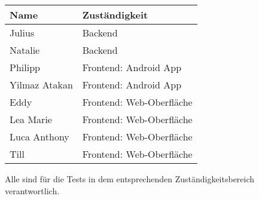 \begin{tabular}{ll}
 \rowcolor[HTML]{E7E7E7} 
 \textbf{Name} & \textbf{Zuständigkeit} \\ \hline
  Julius & Backend \\  
 Natalie & Backend \\
  
  \rowcolor[HTML]{E7E7E7} 
   Philipp &  Frontend: Android App \\ 
 \rowcolor[HTML]{E7E7E7} 
 Yilmaz Atakan & Frontend: Android App \\
 
 Eddy & Frontend: Web-Oberfläche \\  
 Lea Marie & Frontend: Web-Oberfläche \\ 
 Luca Anthony & Frontend: Web-Oberfläche \\ 
 Till & Frontend: Web-Oberfläche \\ 
\end{tabular}

\bigskip

Alle sind für die Tests in dem entsprechenden Zuständigkeitsbereich verantwortlich.


